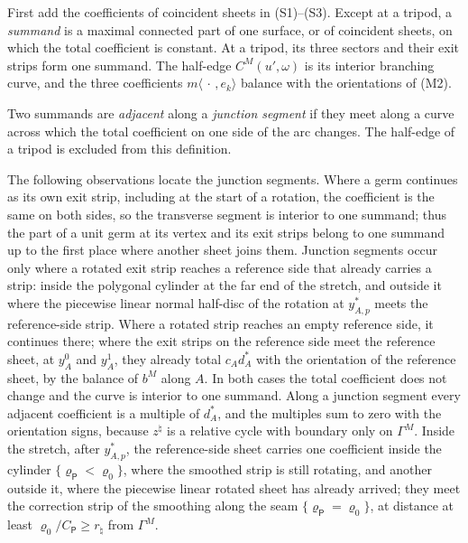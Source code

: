 \begin{definition}\label{def:summand}
First add the coefficients of coincident sheets in (S1)--(S3). Except at a tripod, a \emph{summand} is a maximal
connected part of one surface, or of coincident sheets, on which the total coefficient is constant. At a tripod, its three sectors and their exit strips
form one summand. The half-edge $C^M(u',\omega)$ is its interior branching curve, and the three coefficients
$m\langle\,\cdot\,,e_k\rangle$ balance with the orientations of (M2).

Two summands are \emph{adjacent} along a \emph{junction segment} if they meet along a curve across which the total
coefficient on one side of the arc changes. The half-edge of a tripod is excluded from this definition.
\end{definition}

The following observations locate the junction segments. Where a germ continues as its own exit strip, including at the
start of a rotation, the coefficient is the same on both sides, so the transverse segment is interior to one summand;
thus the part of a unit germ at its vertex and its exit strips belong to one summand up to the first place where another
sheet joins them. Junction segments occur only where a rotated exit strip reaches a reference side that already carries a
strip: inside the polygonal cylinder at the far end of the stretch, and outside it where the piecewise linear normal
half-disc of the rotation at $y^*_{A,p}$ meets the reference-side strip. Where a rotated strip reaches an empty reference
side, it continues there; where the exit strips on the reference side meet the reference sheet, at $y^0_A$ and $y^1_A$,
they already total $c_Ad^*_A$ with the orientation of the reference sheet, by the balance of $b^M$ along $A$. In both
cases the total coefficient does not change and the curve is interior to one summand. Along a junction segment every
adjacent coefficient is a multiple of $d^*_A$, and the multiples sum to zero with the orientation signs, because
$z^\natural$ is a relative cycle with boundary only on $\Gamma^M$. Inside the stretch, after $y^*_{A,p}$, the
reference-side sheet carries one coefficient inside the cylinder $\{\varrho_{\mathsf P}<\varrho_0\}$, where the smoothed
strip is still rotating, and another outside it, where the piecewise linear rotated sheet has already arrived; they meet
the correction strip of the smoothing along the seam $\{\varrho_{\mathsf P}=\varrho_0\}$, at distance at least
$\varrho_0/C_{\mathsf P}\ge r_\natural$ from $\Gamma^M$.

